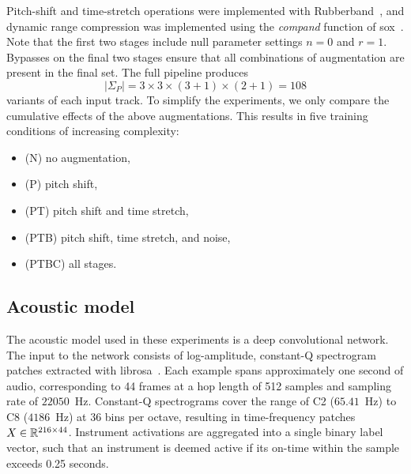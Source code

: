 \documentclass{article}
\begin{document}
Pitch-shift and time-stretch operations were implemented with Rubberband~\cite{rubberband}, 
and dynamic range compression was implemented using the \emph{compand} function of 
sox~\cite{sox}.
Note that the first two stages include null parameter settings $n=0$ and $r=1$.
Bypasses on the final two stages ensure that all combinations of augmentation are
present in the final set.
The full pipeline produces \[
|\Sigma_P| = 3\times 3\times (3+1)\times (2+1) = 108\]
variants of each input track.  To simplify the experiments, we only compare the cumulative effects of the above
augmentations.  This results in five training conditions of increasing complexity:
\begin{itemize}
    \item (N) no augmentation,
        \vspace{-.5\baselineskip}
    \item (P) pitch shift,
        \vspace{-.5\baselineskip}
    \item (PT) pitch shift and time stretch,
        \vspace{-.5\baselineskip}
    \item (PTB) pitch shift, time stretch, and noise,
        \vspace{-.5\baselineskip}
    \item (PTBC) all stages.
\end{itemize}

\subsection{Acoustic model}

%
%

The acoustic model used in these experiments is a deep convolutional network.
The input to the network consists of log-amplitude, constant-Q spectrogram patches extracted with librosa~\cite{librosa}.
Each example spans approximately one second of audio, corresponding to 44 frames at a hop length of 512 samples and sampling rate of $22050$~Hz.
Constant-Q spectrograms cover the range of C2 ($65.41$~Hz) to C8 ($4186$~Hz) at 36 bins
per octave, resulting in time-frequency patches $X \in \mathbb{R}^{216\times44}$.
Instrument activations are aggregated into a single binary label vector, such that an instrument is deemed active if its on-time within the sample exceeds 0.25 seconds.
\end{document}
